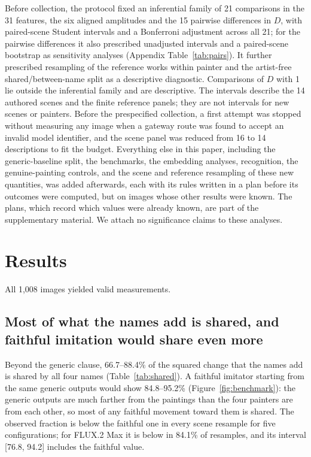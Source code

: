 \documentclass[10pt]{article}
\begin{document}
Before collection, the protocol fixed an inferential family of 21 comparisons in the 31 features,
the six aligned amplitudes and the 15 pairwise differences in $D$, with paired-scene Student
intervals and a Bonferroni adjustment across all 21; for the pairwise differences it also
prescribed unadjusted intervals and a paired-scene bootstrap as sensitivity analyses (Appendix
Table~\ref{tab:pairs}). It further prescribed resampling of the reference works within painter and
the artist-free shared/between-name split as a descriptive diagnostic. Comparisons of $D$ with 1
lie outside the inferential family and are descriptive. The intervals describe the 14 authored
scenes and the finite reference panels; they are not intervals for new scenes or painters. Before
the prespecified collection, a first attempt was stopped without measuring any image when a
gateway route was found to accept an invalid model identifier, and the scene panel was reduced
from 16 to 14 descriptions to fit the budget. Everything else in this paper, including the
generic-baseline split, the benchmarks, the embedding analyses, recognition, the genuine-painting
controls, and the scene and reference resampling of these new quantities, was added afterwards,
each with its rules written in a plan before its outcomes were computed, but on images whose other
results were known. The plans, which record which values were already known, are part of the
supplementary material. We attach no significance claims to these analyses.

\section{Results}\label{sec:results}

All 1,008 images yielded valid measurements.

\subsection{Most of what the names add is shared, and faithful imitation would share even more}\label{sec:shared}



Beyond the generic clause, 66.7--88.4\% of the squared change that the names add is shared by all
four names (Table~\ref{tab:shared}). A faithful imitator starting from the same generic outputs
would show 84.8--95.2\% (Figure~\ref{fig:benchmark}): the generic outputs are much farther from the
paintings than the four painters are from each other, so most of any faithful movement toward them
is shared. The observed fraction is below the faithful one in every scene resample for five
configurations; for FLUX.2 Max it is below in 84.1\% of resamples, and its interval [76.8, 94.2]
includes the faithful value.
\end{document}
